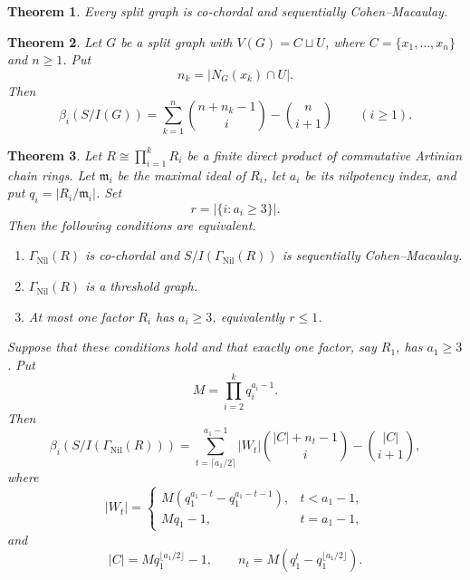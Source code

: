 \documentclass[10pt,a4paper]{amsart}
\newtheorem{theorem}{Theorem}
\begin{document}
	\begin{theorem}\label{thm:split_is_scm}
Every split graph is co-chordal and sequentially Cohen--Macaulay.
\end{theorem}

	\begin{theorem}\label{thm:split_betti}
Let $G$ be a split graph with $V(G)=C\sqcup U$, where $C=\{x_1,\ldots,x_n\}$ and $n\ge1$.  Put
\[
n_k=|N_G(x_k)\cap U|.
\]
Then
\[
\beta_i(S/I(G))
=
\sum_{k=1}^{n}\binom{n+n_k-1}{i}
-
\binom{n}{i+1}
\qquad(i\ge1).
\]
\end{theorem}

\begin{theorem}\label{thm:master_nilpotent}
Let $R\cong\prod_{i=1}^{k}R_i$ be a finite direct product of commutative Artinian chain rings.  Let $\mathfrak m_i$ be the maximal ideal of $R_i$, let $a_i$ be its nilpotency index, and put $q_i=|R_i/\mathfrak m_i|$.  Set
\[
r=\bigl|\{i:a_i\ge3\}\bigr|.
\]
Then the following conditions are equivalent.
\begin{enumerate}
\item $\Gamma_{\operatorname{Nil}}(R)$ is co-chordal and $S/I(\Gamma_{\operatorname{Nil}}(R))$ is sequentially Cohen--Macaulay.
\item $\Gamma_{\operatorname{Nil}}(R)$ is a threshold graph.
\item At most one factor $R_i$ has $a_i\ge3$, equivalently $r\le1$.
\end{enumerate}

Suppose that these conditions hold and that exactly one factor, say $R_1$, has $a_1\ge3$.  Put
\[
M=\prod_{i=2}^{k}q_i^{a_i-1}.
\]
Then
\begin{equation}\label{eq:nil_product}
\beta_i(S/I(\Gamma_{\operatorname{Nil}}(R)))
=
\sum_{t=\lceil a_1/2\rceil}^{a_1-1}|W_t|
\binom{|C|+n_t-1}{i}
-
\binom{|C|}{i+1},
\end{equation}
where
\[
|W_t|=
\begin{cases}
M(q_1^{a_1-t}-q_1^{a_1-t-1}),&t<a_1-1,\\
Mq_1-1,&t=a_1-1,
\end{cases}
\]
and
\[
|C|=Mq_1^{\lfloor a_1/2\rfloor}-1,
\qquad
n_t=M(q_1^t-q_1^{\lfloor a_1/2\rfloor}).
\]
\end{theorem}
\end{document}

